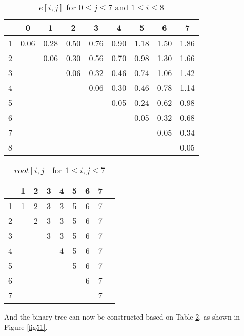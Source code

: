 \begin{table}[H]\centering
\begin{tabular}{c c c c c c c c c}
  & 0    & 1    & 2    & 3    & 4    & 5    & 6    & 7\\\hline
1 & 0.06 & 0.28 & 0.50 & 0.76 & 0.90 & 1.18 & 1.50 & 1.86\\ 
2 &      & 0.06 & 0.30 & 0.56 & 0.70 & 0.98 & 1.30 & 1.66\\ 
3 &      &      & 0.06 & 0.32 & 0.46 & 0.74 & 1.06 & 1.42\\ 
4 &      &      &      & 0.06 & 0.30 & 0.46 & 0.78 & 1.14\\ 
5 &      &      &      &      & 0.05 & 0.24 & 0.62 & 0.98\\ 
6 &      &      &      &      &      & 0.05 & 0.32 & 0.68\\ 
7 &      &      &      &      &      &      & 0.05 & 0.34\\
8 &      &      &      &      &      &      &      & 0.05\\\hline
\end{tabular}
\caption{$e[i,j]$ for $0 \leq j \leq 7$ and $1 \leq i \leq 8$}\label{tab53}
\end{table}

\begin{table}[H]\centering
\begin{tabular}{c c c c c c c c c}
  & 1    & 2    & 3 & 4 & 5 & 6 & 7\\\hline
1 & 1 & 2 & 3 & 3 & 5 & 6 & 7\\ 
2 &   & 2 & 3 & 3 & 5 & 6 & 7\\ 
3 &   &   & 3 & 3 & 5 & 6 & 7\\ 
4 &   &   &   & 4 & 5 & 6 & 7\\ 
5 &   &   &   &   & 5 & 6 & 7\\ 
6 &   &   &   &   &   & 6 & 7\\ 
7 &   &   &   &   &   &   & 7\\\hline
\end{tabular}
\caption{$root[i,j]$ for $1 \leq i,j \leq 7$}\label{tab54}
\end{table}

And the binary tree can now be constructed based on Table \ref{tab54}, as shown in Figure \ref{fig51}.

